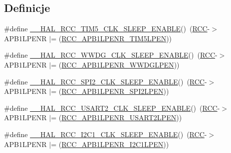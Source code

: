 \subsection*{Definicje}
\begin{DoxyCompactItemize}
\item 
\#define \hyperlink{group___r_c_c___a_p_b1___low_power___enable___disable_gae99e46f9e40655dc9b5c07b03fdc4a4e}{\+\_\+\+\_\+\+H\+A\+L\+\_\+\+R\+C\+C\+\_\+\+T\+I\+M5\+\_\+\+C\+L\+K\+\_\+\+S\+L\+E\+E\+P\+\_\+\+E\+N\+A\+B\+LE}()~(\hyperlink{group___peripheral__declaration_ga74944438a086975793d26ae48d5882d4}{R\+CC}-\/$>$A\+P\+B1\+L\+P\+E\+NR $\vert$= (\hyperlink{group___peripheral___registers___bits___definition_ga5741a6c45b9de1d0c927beb87f399dd9}{R\+C\+C\+\_\+\+A\+P\+B1\+L\+P\+E\+N\+R\+\_\+\+T\+I\+M5\+L\+P\+EN}))
\item 
\#define \hyperlink{group___r_c_c___a_p_b1___low_power___enable___disable_gaa3978a2e193b921dc24976880dce7a26}{\+\_\+\+\_\+\+H\+A\+L\+\_\+\+R\+C\+C\+\_\+\+W\+W\+D\+G\+\_\+\+C\+L\+K\+\_\+\+S\+L\+E\+E\+P\+\_\+\+E\+N\+A\+B\+LE}()~(\hyperlink{group___peripheral__declaration_ga74944438a086975793d26ae48d5882d4}{R\+CC}-\/$>$A\+P\+B1\+L\+P\+E\+NR $\vert$= (\hyperlink{group___peripheral___registers___bits___definition_ga13f3db4ac67bf32c994364cc43f4fe8b}{R\+C\+C\+\_\+\+A\+P\+B1\+L\+P\+E\+N\+R\+\_\+\+W\+W\+D\+G\+L\+P\+EN}))
\item 
\#define \hyperlink{group___r_c_c___a_p_b1___low_power___enable___disable_ga8a281ca72aff1c9fa87755c3854cc316}{\+\_\+\+\_\+\+H\+A\+L\+\_\+\+R\+C\+C\+\_\+\+S\+P\+I2\+\_\+\+C\+L\+K\+\_\+\+S\+L\+E\+E\+P\+\_\+\+E\+N\+A\+B\+LE}()~(\hyperlink{group___peripheral__declaration_ga74944438a086975793d26ae48d5882d4}{R\+CC}-\/$>$A\+P\+B1\+L\+P\+E\+NR $\vert$= (\hyperlink{group___peripheral___registers___bits___definition_ga41dcbf845448cbb1b75c0ad7e83b77cb}{R\+C\+C\+\_\+\+A\+P\+B1\+L\+P\+E\+N\+R\+\_\+\+S\+P\+I2\+L\+P\+EN}))
\item 
\#define \hyperlink{group___r_c_c___a_p_b1___low_power___enable___disable_ga12132da4a7f5c62f32cd9d91b1c99495}{\+\_\+\+\_\+\+H\+A\+L\+\_\+\+R\+C\+C\+\_\+\+U\+S\+A\+R\+T2\+\_\+\+C\+L\+K\+\_\+\+S\+L\+E\+E\+P\+\_\+\+E\+N\+A\+B\+LE}()~(\hyperlink{group___peripheral__declaration_ga74944438a086975793d26ae48d5882d4}{R\+CC}-\/$>$A\+P\+B1\+L\+P\+E\+NR $\vert$= (\hyperlink{group___peripheral___registers___bits___definition_ga6055c39af369463e14d6ff2017043671}{R\+C\+C\+\_\+\+A\+P\+B1\+L\+P\+E\+N\+R\+\_\+\+U\+S\+A\+R\+T2\+L\+P\+EN}))
\item 
\#define \hyperlink{group___r_c_c___a_p_b1___low_power___enable___disable_ga894dbeada170b01faef303d35de84917}{\+\_\+\+\_\+\+H\+A\+L\+\_\+\+R\+C\+C\+\_\+\+I2\+C1\+\_\+\+C\+L\+K\+\_\+\+S\+L\+E\+E\+P\+\_\+\+E\+N\+A\+B\+LE}()~(\hyperlink{group___peripheral__declaration_ga74944438a086975793d26ae48d5882d4}{R\+CC}-\/$>$A\+P\+B1\+L\+P\+E\+NR $\vert$= (\hyperlink{group___peripheral___registers___bits___definition_ga33286469d0a9b9fedbc2b60aa6cd7da7}{R\+C\+C\+\_\+\+A\+P\+B1\+L\+P\+E\+N\+R\+\_\+\+I2\+C1\+L\+P\+EN}))

\end{DoxyCompactItemize}
